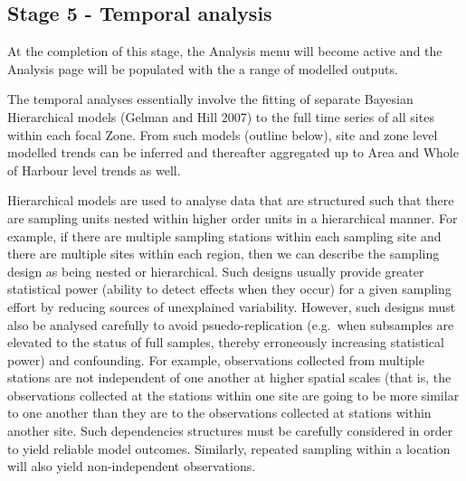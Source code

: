 \documentclass[
  8pt,
  a4paper]{article}
\begin{document}
\subsection{Stage 5 - Temporal
analysis}\label{stage-5---temporal-analysis}

At the completion of this stage, the Analysis menu will become active
and the Analysis page will be populated with the a range of modelled
outputs.

The temporal analyses essentially involve the fitting of separate
Bayesian Hierarchical models (Gelman and Hill 2007) to the full time
series of all sites within each focal Zone. From such models (outline
below), site and zone level modelled trends can be inferred and
thereafter aggregated up to Area and Whole of Harbour level trends as
well.

\begin{tcolorbox}[enhanced jigsaw, breakable, rightrule=.15mm, toprule=.15mm, colbacktitle=quarto-callout-note-color!10!white, colframe=quarto-callout-note-color-frame, coltitle=black, bottomrule=.15mm, colback=white, opacityback=0, bottomtitle=1mm, left=2mm, title=\textcolor{quarto-callout-note-color}{\faInfo}\hspace{0.5em}{Bayesian hierarchical models}, toptitle=1mm, titlerule=0mm, arc=.35mm, opacitybacktitle=0.6, leftrule=.75mm]

Hierarchical models are used to analyse data that are structured such
that there are sampling units nested within higher order units in a
hierarchical manner. For example, if there are multiple sampling
stations within each sampling site and there are multiple sites within
each region, then we can describe the sampling design as being nested or
hierarchical. Such designs usually provide greater statistical power
(ability to detect effects when they occur) for a given sampling effort
by reducing sources of unexplained variability. However, such designs
must also be analysed carefully to avoid psuedo-replication (e.g.~when
subsamples are elevated to the status of full samples, thereby
erroneously increasing statistical power) and confounding. For example,
observations collected from multiple stations are not independent of one
another at higher spatial scales (that is, the observations collected at
the stations within one site are going to be more similar to one another
than they are to the observations collected at stations within another
site. Such dependencies structures must be carefully considered in order
to yield reliable model outcomes. Similarly, repeated sampling within a
location will also yield non-independent observations.


\end{tcolorbox}
\end{document}
